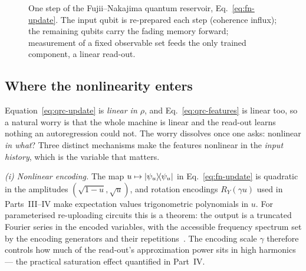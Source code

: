 \begin{figure}[t]
\centering
{}
\caption{One step of the Fujii--Nakajima quantum reservoir,
Eq.~\eqref{eq:fn-update}. The input qubit is re-prepared each step (coherence
influx); the remaining qubits carry the fading memory forward; measurement of
a fixed observable set feeds the only trained component, a linear read-out.}
\label{fig:qrc-pipeline}
\end{figure}

\subsection{Where the nonlinearity enters}
\label{sec:nonlinearity}

Equation~\eqref{eq:qrc-update} is \emph{linear in $\rho$}, and
Eq.~\eqref{eq:qrc-features} is linear too, so a natural worry is that the
whole machine is linear and the read-out learns nothing an autoregression
could not. The worry dissolves once one asks: nonlinear \emph{in what}? Three
distinct mechanisms make the features nonlinear in the \emph{input history},
which is the variable that matters.

\emph{(i) Nonlinear encoding.} The map $u \mapsto |\psi_u\rangle\!\langle\psi_u|$ in
Eq.~\eqref{eq:fn-update} is quadratic in the amplitudes
$(\sqrt{1-u},\sqrt{u})$, and rotation encodings $R_Y(\gamma u)$ used in
Parts~III--IV make expectation values trigonometric polynomials in $u$. For
parameterised re-uploading circuits this is a theorem: the output is a
truncated Fourier series in the encoded variables, with the accessible
frequency spectrum set by the encoding generators and their
repetitions~\citep{schuld2021effect}. The encoding scale $\gamma$ therefore
controls how much of the read-out's approximation power sits in high
harmonics --- the practical saturation effect quantified in Part~IV.

